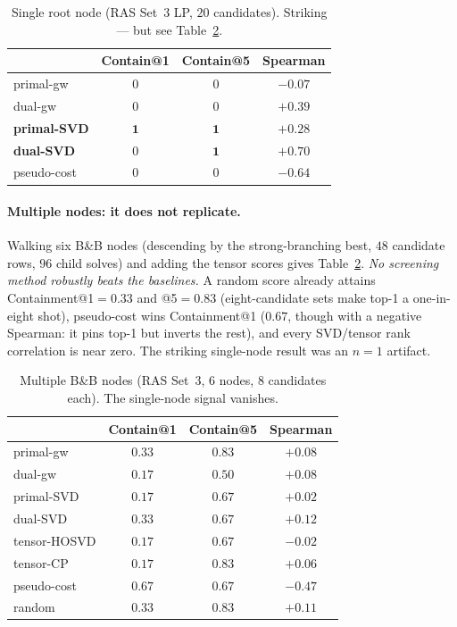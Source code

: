 \documentclass[11pt]{article}
\begin{document}
\begin{table}[h]\centering
\caption{Single root node (RAS Set~3 LP, $20$ candidates). Striking --- but see
Table~\ref{tab:multi}.}
\label{tab:root}
\begin{tabular}{lccc}
\toprule
 & Contain@1 & Contain@5 & Spearman \\
\midrule
primal-gw   & $0$ & $0$ & $-0.07$ \\
dual-gw     & $0$ & $0$ & $+0.39$ \\
\textbf{primal-SVD} & $\mathbf{1}$ & $\mathbf{1}$ & $+0.28$ \\
\textbf{dual-SVD}   & $0$ & $\mathbf{1}$ & $\mathbf{+0.70}$ \\
pseudo-cost & $0$ & $0$ & $-0.64$ \\
\bottomrule
\end{tabular}
\end{table}

\paragraph{Multiple nodes: it does not replicate.} Walking six B\&B nodes (descending by the
strong-branching best, $48$ candidate rows, $96$ child solves) and adding the tensor scores
gives Table~\ref{tab:multi}. \emph{No screening method robustly beats the baselines.} A random
score already attains Containment@1$=0.33$ and @5$=0.83$ (eight-candidate sets make top-1 a
one-in-eight shot), pseudo-cost wins Containment@1 ($0.67$, though with a negative Spearman:
it pins top-1 but inverts the rest), and every SVD/tensor rank correlation is near zero. The
striking single-node result was an $n\!=\!1$ artifact.

\begin{table}[h]\centering
\caption{Multiple B\&B nodes (RAS Set~3, $6$ nodes, $8$ candidates each). The single-node
signal vanishes.}
\label{tab:multi}
\begin{tabular}{lccc}
\toprule
 & Contain@1 & Contain@5 & Spearman \\
\midrule
primal-gw    & $0.33$ & $0.83$ & $+0.08$ \\
dual-gw      & $0.17$ & $0.50$ & $+0.08$ \\
primal-SVD   & $0.17$ & $0.67$ & $+0.02$ \\
dual-SVD     & $0.33$ & $0.67$ & $+0.12$ \\
tensor-HOSVD & $0.17$ & $0.67$ & $-0.02$ \\
tensor-CP    & $0.17$ & $0.83$ & $+0.06$ \\
pseudo-cost  & $\mathbf{0.67}$ & $0.67$ & $-0.47$ \\
random       & $0.33$ & $0.83$ & $+0.11$ \\
\bottomrule
\end{tabular}
\end{table}
\end{document}
